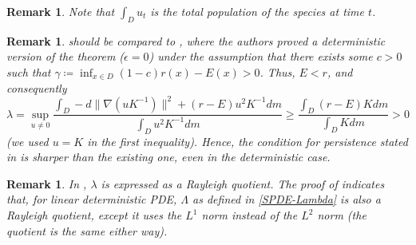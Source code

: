 \documentclass[final]{amsart}
\newtheorem{rem}[thm]{Remark}
\numberwithin{thm}{section}
\numberwithin{equation}{section}
\begin{document}
\begin{rem}
  Note that $\int_D u_t$ is the total population of the species at time $t$.
\end{rem}

\begin{rem}\label{rem:rayleigh}
     should be compared to \cite[Corollary 1]{carrying-capacity}, where the authors proved a deterministic version of the theorem ($\epsilon = 0$) under the assumption that there exists some $c > 0$ such that $\gamma \coloneqq \inf_{x \in D} (1-c)r(x) - E(x) > 0$. Thus, $E < r$, and consequently 
    $$
    \lambda = \sup_{u \neq 0} \frac{\int_D -d\|\nabla(uK^{-1})\|^2 + (r-E)u^2K^{-1}dm}{\int_D u^2K^{-1}dm} \geq \frac{\int_D (r-E)Kdm}{\int_D Kdm} > 0
    $$ 
    (we used $u = K$ in the first inequality). Hence, the condition for persistence stated in  is sharper than the existing one, even in the deterministic case.
\end{rem}

\begin{rem}\label{rem:rayleigh-quotient}
    In , $\lambda$ is expressed as a Rayleigh quotient. The proof of  indicates that, for linear deterministic PDE, $\Lambda$ as defined in \eqref{SPDE-Lambda} is also a Rayleigh quotient, except it uses the $L^1$ norm instead of the $L^2$ norm (the quotient is the same either way).
\end{rem}
\end{document}
